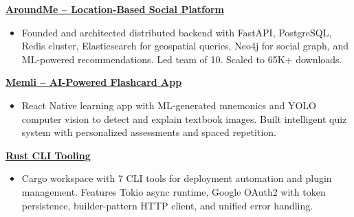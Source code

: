 \documentclass[11pt,a4paper]{article}
\begin{document}
\vspace{12pt}
\noindent\textbf{\href{https://shanmukeshwar.dev}{\textcolor{linkblue}{AroundMe -- Location-Based Social Platform}}}
\begin{itemize}[leftmargin=*, topsep=6pt, itemsep=6pt, parsep=0pt]
    \item Founded and architected distributed backend with FastAPI, PostgreSQL, Redis cluster, Elasticsearch for geospatial queries, Neo4j for social graph, and ML-powered recommendations. Led team of 10. Scaled to 65K+ downloads.
\end{itemize}

\vspace{12pt}
\noindent\textbf{\href{https://shanmukeshwar.dev}{\textcolor{linkblue}{Memli -- AI-Powered Flashcard App}}}
\begin{itemize}[leftmargin=*, topsep=6pt, itemsep=6pt, parsep=0pt]
    \item React Native learning app with ML-generated mnemonics and YOLO computer vision to detect and explain textbook images. Built intelligent quiz system with personalized assessments and spaced repetition.
\end{itemize}

\vspace{12pt}
\noindent\textbf{\href{https://github.com/thestackdev}{\textcolor{linkblue}{Rust CLI Tooling}}}
\begin{itemize}[leftmargin=*, topsep=6pt, itemsep=6pt, parsep=0pt]
    \item Cargo workspace with 7 CLI tools for deployment automation and plugin management. Features Tokio async runtime, Google OAuth2 with token persistence, builder-pattern HTTP client, and unified error handling.
\end{itemize}
\end{document}
